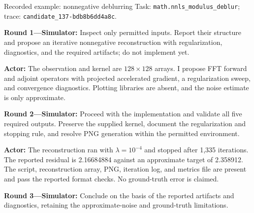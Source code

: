 \begin{promptframe}{Recorded example: nonnegative deblurring}
Task: \texttt{math.nnls\_modulus\_deblur};
trace: \texttt{candidate\_137-bdb8b6dd4a8c}.
\par\smallskip
\textbf{Round 1---Simulator:} Inspect only permitted inputs. Report their
structure and propose an iterative nonnegative reconstruction with
regularization, diagnostics, and the required artifacts; do not implement yet.\par
\textbf{Actor:} The observation and kernel are $128\times128$ arrays.
I propose FFT forward and adjoint operators with projected accelerated
gradient, a regularization sweep, and convergence diagnostics. Plotting
libraries are absent, and the noise estimate is only approximate.\par
\textbf{Round 2---Simulator:} Proceed with the implementation and validate
all five required outputs. Preserve the supplied kernel, document the
regularization and stopping rule, and resolve PNG generation within the
permitted environment.\par
\textbf{Actor:} The reconstruction ran with $\lambda=10^{-4}$ and stopped
after 1,335 iterations. The reported residual is 2.16684884 against an
approximate target of 2.358912. The script, reconstruction array, PNG,
iteration log, and metrics file are present and pass the reported format
checks. No ground-truth error is claimed.\par
\textbf{Round 3---Simulator:} Conclude on the basis of the reported artifacts
and diagnostics, retaining the approximate-noise and ground-truth limitations.
\end{promptframe}
